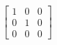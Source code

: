 \documentclass[preview]{standalone}
\begin{document}
\begin{align*}
\left[ \begin{array}{ccc}1 & 0 & 0 \\ 0 & 1 & 0 \\ 0 & 0 & 0\end{array} \right]
\end{align*}
\end{document}

